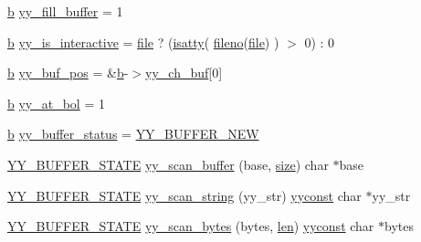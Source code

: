 \begin{DoxyCompactItemize}
\item 
\mbox{\hyperlink{expr-lex_8cpp_a91b64995742fd30063314f12340b4b5a}{b}} \mbox{\hyperlink{expr-lex_8cpp_a0a1dd9ce87a49536adf8f6362b071057}{yy\+\_\+fill\+\_\+buffer}} = 1
\item 
\mbox{\hyperlink{expr-lex_8cpp_a91b64995742fd30063314f12340b4b5a}{b}} \mbox{\hyperlink{expr-lex_8cpp_ad05318f0f8d19c7e46d72303ae11820e}{yy\+\_\+is\+\_\+interactive}} = \mbox{\hyperlink{expr-lex_8cpp_a702945180aa732857b380a007a7e2a21}{file}} ? (\mbox{\hyperlink{expr-lex_8cpp_aef88e7abfad3a0a8812ec4a04ea1de6b}{isatty}}( \mbox{\hyperlink{expr-lex_8cpp_a2c12e4b6615ac6838a99d5b6fa619683}{fileno}}(\mbox{\hyperlink{expr-lex_8cpp_a702945180aa732857b380a007a7e2a21}{file}}) ) $>$ 0) \+: 0
\item 
\mbox{\hyperlink{expr-lex_8cpp_a91b64995742fd30063314f12340b4b5a}{b}} \mbox{\hyperlink{expr-lex_8cpp_a4eab751080565d2d6e83560583d15d1c}{yy\+\_\+buf\+\_\+pos}} = \&\mbox{\hyperlink{expr-lex_8cpp_a91b64995742fd30063314f12340b4b5a}{b}}-\/$>$\mbox{\hyperlink{expr-lex_8cpp_a49f3339224f2ff52f9191b351b184dbd}{yy\+\_\+ch\+\_\+buf}}\mbox{[}0\mbox{]}
\item 
\mbox{\hyperlink{expr-lex_8cpp_a91b64995742fd30063314f12340b4b5a}{b}} \mbox{\hyperlink{expr-lex_8cpp_adef6ed71d4cd59407dc44578f94e5fec}{yy\+\_\+at\+\_\+bol}} = 1
\item 
\mbox{\hyperlink{expr-lex_8cpp_a91b64995742fd30063314f12340b4b5a}{b}} \mbox{\hyperlink{expr-lex_8cpp_a44b78dddb082281d797f84223687c7e1}{yy\+\_\+buffer\+\_\+status}} = \mbox{\hyperlink{expr-lex_8cpp_a53579db42834b88199458993912c646d}{Y\+Y\+\_\+\+B\+U\+F\+F\+E\+R\+\_\+\+N\+EW}}
\item 
\mbox{\hyperlink{expr-lex_8cpp_a4e5bd2d129903df83f3d13effaf8f3e4}{Y\+Y\+\_\+\+B\+U\+F\+F\+E\+R\+\_\+\+S\+T\+A\+TE}} \mbox{\hyperlink{expr-lex_8cpp_af9ed770023a73cfa0b6cfd90b5a76fc9}{yy\+\_\+scan\+\_\+buffer}} (base, \mbox{\hyperlink{expr-lex_8cpp_ab7d671599a7b25ca99a487fa341bc33a}{size}}) char $\ast$base
\item 
\mbox{\hyperlink{expr-lex_8cpp_a4e5bd2d129903df83f3d13effaf8f3e4}{Y\+Y\+\_\+\+B\+U\+F\+F\+E\+R\+\_\+\+S\+T\+A\+TE}} \mbox{\hyperlink{expr-lex_8cpp_ac0d3a22f8bc4cc5e7af2783fe375d5b0}{yy\+\_\+scan\+\_\+string}} (yy\+\_\+str) \mbox{\hyperlink{expr-lex_8cpp_aa2f1a918be586b44bf08126bde2d7cc9}{yyconst}} char $\ast$yy\+\_\+str
\item 
\mbox{\hyperlink{expr-lex_8cpp_a4e5bd2d129903df83f3d13effaf8f3e4}{Y\+Y\+\_\+\+B\+U\+F\+F\+E\+R\+\_\+\+S\+T\+A\+TE}} \mbox{\hyperlink{expr-lex_8cpp_afe1a1d0d2103208153f7037bef67be96}{yy\+\_\+scan\+\_\+bytes}} (bytes, \mbox{\hyperlink{expr-lex_8cpp_afed088663f8704004425cdae2120b9b3}{len}}) \mbox{\hyperlink{expr-lex_8cpp_aa2f1a918be586b44bf08126bde2d7cc9}{yyconst}} char $\ast$bytes

\end{DoxyCompactItemize}
